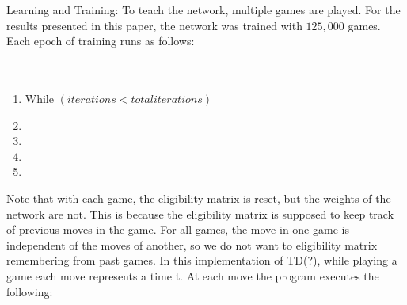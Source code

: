 \documentclass{sig-alternate-05-2015}
\begin{document}
Learning and Training:
To teach the network, multiple games are played. For the results presented in this paper, the network was trained with $125,000$ games. Each epoch of training runs as follows:
\\ \\ \\ 

\begin{enumerate}
\itemsep0em 
\item While $(iterations < total iterations)$
\item  \hspace*{.5cm}
\item  \hspace*{1cm}
\item  \hspace*{.5cm}
\item   \hspace*{1cm}
\end{enumerate}


Note that with each game, the eligibility matrix is reset, but the weights of the network are not. This is because the eligibility matrix is supposed to keep track of previous moves in the game. For all games, the move in one game is independent of the moves of another, so we do not want to eligibility matrix remembering from past games. In this implementation of TD(?), while playing a game each move represents a time t. At each move the program executes the following:
\end{document}
